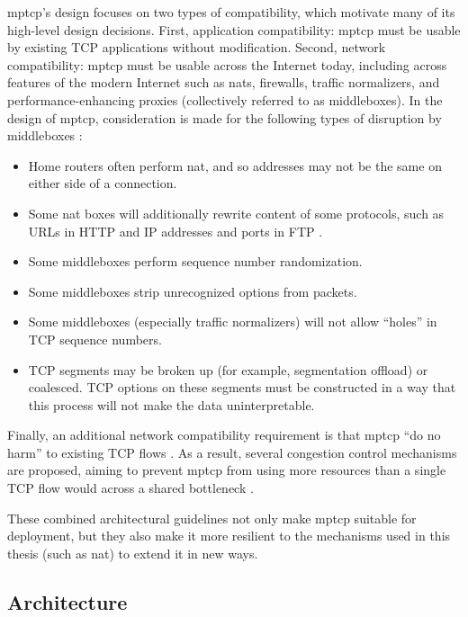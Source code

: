 \documentclass{cwru}
\begin{document}
\ac{mptcp}'s design focuses on two types of compatibility, which motivate many
of its high-level design decisions. First, application compatibility: \ac{mptcp}
must be usable by existing TCP applications without modification. Second,
network compatibility: \ac{mptcp} must be usable across the Internet today,
including across features of the modern Internet such as \acp{nat}, firewalls,
traffic normalizers, and performance-enhancing proxies (collectively referred to
as middleboxes). In the design of \ac{mptcp}, consideration is made for the
following types of disruption by middleboxes \cite{rfc6182}:

\begin{itemize}
\item Home routers often perform \ac{nat}, and so addresses may not be the same
  on either side of a connection.
\item Some \ac{nat} boxes will additionally rewrite content of some protocols,
  such as URLs in HTTP \cite{rfc6182} and IP addresses and ports in FTP
  \cite{raiciu2012hard}.
\item Some middleboxes perform sequence number randomization.
\item Some middleboxes strip unrecognized options from packets.
\item Some middleboxes (especially traffic normalizers) will not allow ``holes''
  in TCP sequence numbers.
\item TCP segments may be broken up (for example, segmentation offload) or
  coalesced. TCP options on these segments must be constructed in a way that
  this process will not make the data uninterpretable.
\end{itemize}

Finally, an additional network compatibility requirement is that \acl{mptcp}
``do no harm'' to existing TCP flows \cite{rfc6182}. As a result, several
congestion control mechanisms are proposed, aiming to prevent \ac{mptcp} from
using more resources than a single TCP flow would across a shared bottleneck
\cite{rfc6356,draft-olia,draft-balia,draft-wvegas}.

These combined architectural guidelines not only make \ac{mptcp} suitable for
deployment, but they also make it more resilient to the mechanisms used in this
thesis (such as \ac{nat}) to extend it in new ways.

\subsection{Architecture}
\end{document}
